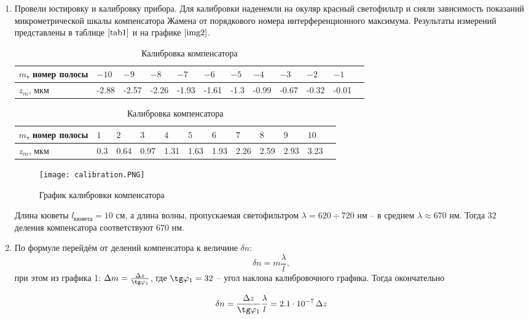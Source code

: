 \documentclass[a4paper,12pt]{article} %
\begin{document}
\begin{enumerate}
    \item Провели юстировку и калибровку прибора. Для калибровки наденемли на окуляр красный светофильтр и сняли зависимость показаний микрометрической шкалы компенсатора Жамена от порядкового номера интерференционного максимума. Результаты измерений представлены в таблице $\ref{tab1}$ и на графике $\ref{img2}$.
 
    \begin{table}[h]
    \centering
    \begin{tabular}{|*{12}{l|}} \hline
        $m$, номер полосы & $-10$ & $-9$ & $-8$ & $-7$ & $-6$ & $-5$ & $-4$ & $-3$ & $-2$ & $-1$ \\ \hline
        $z_m$, мкм & -2.88 & -2.57 & -2.26 & -1.93 & -1.61 & -1.3 & -0.99 & -0.67 & -0.32 & -0.01 \\ \hline   
    \end{tabular}
    \begin{tabular}{|*{12}{l|}} \hline
        $m$, номер полосы & $1$ & $2$ & $3$ & $4$ & $5$ & $6$ & $7$ & $8$ & $9$ & $10$ \\ \hline
        $z_m$, мкм & 0.3 & 0.64 & 0.97 & 1.31 & 1.63 & 1.93 & 2.26 & 2.59 & 2.93 & 3.23 \\ \hline   
    \end{tabular}
    \label{tab1}
    \caption{Калибровка компенсатора}
\end{table}
    
\begin{figure}[h]
    \centering
    \texttt{[image: calibration.PNG]}
    \caption{График калибровки компенсатора}
    \label{img2}
\end{figure}

Длина кюветы $l_{кювета} = 10$ см, а длина волны, пропускаемая светофильтром $\lambda = 620 \div 720$ нм -- в среднем $\lambda \approx 670$ нм. Тогда $32$ деления компенсатора соответствуют $670$ нм. 

\item По формуле перейдём от делений компенсатора к величине $\delta n$:
\begin{equation}
    \delta n = m\frac{\lambda}{l},
\end{equation}
при этом из графика 1: $\Delta m = \frac{\Delta z}{\tg \varphi_1}$, где $\tg \varphi_1 = 32$ -- угол наклона калибровочного графика. Тогда окончательно

\begin{equation}
    \delta n = \frac{\Delta z}{\tg \varphi_1} \frac{\lambda}{l} = 2.1 \cdot 10^{-7} \, \Delta z
\end{equation}

\end{enumerate}
\end{document}
